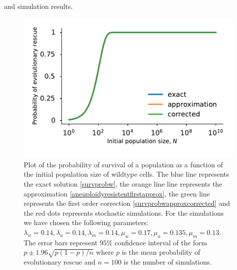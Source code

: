\documentclass[12pt]{extarticle}
\begin{document}
and simulation results.
\begin{figure}[!t]
 \vspace*{1\baselineskip}
\includegraphics[width=1\textwidth]{Figures/SurvPlotNData.pdf}
\caption{Plot of the probability of survival of a population as a function of the initial population size of wildtype cells. The blue line represents the exact solution \eqref{survprobw}, the orange line line represents the approximation \eqref{aneuploidyresistentfirstapprox}, the green line represents the first order correction \eqref{survprobwapproxcorrected} and the red dots represents stochastic simulations. For the simulations we have chosen the following parameters: $\lambda_w=0.14, \lambda_a=0.14,\lambda_m=0.14,\mu_w=0.17,\mu_a=0.135,\mu_m=0.13$. The error bars represent $95\%$ confidence interval of the form $p\pm1.96\sqrt{p\left(1-p\right)/n}$ where $p$ is the mean probability of evolutionary rescue and $n=100$ is the number of simulations.}
\label{SurvPlotNData}
\end{figure}
\end{document}
